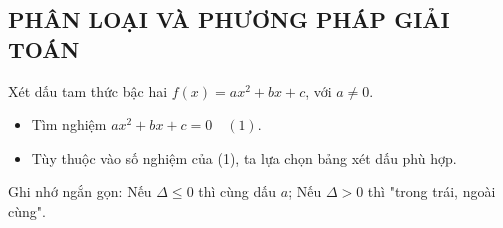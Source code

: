 \subsection{PHÂN LOẠI VÀ PHƯƠNG PHÁP GIẢI TOÁN}
\begin{dang}{Xét dấu tam thức bậc hai $f(x)=ax^2+bx+c$, với $a \ne 0$.}
	\begin{itemize}
		\item [$\bullet$] Tìm nghiệm $ax^2+bx+c=0 \quad (1)$.
		\item [$\bullet$] Tùy thuộc vào số nghiệm của (1), ta lựa chọn bảng xét dấu phù hợp.
	\end{itemize}
	\begin{note}
		Ghi nhớ ngắn gọn: Nếu $\Delta \le 0$ thì cùng dấu $a$; Nếu $\Delta >0 $ thì  "trong trái, ngoài cùng".
	\end{note}
\end{dang}
